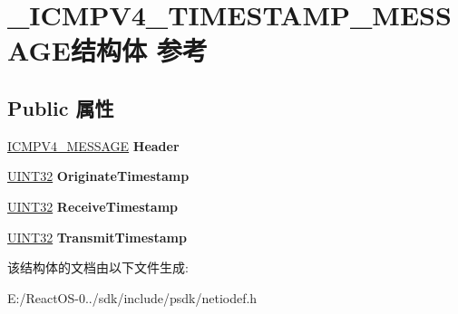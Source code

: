 \hypertarget{struct___i_c_m_p_v4___t_i_m_e_s_t_a_m_p___m_e_s_s_a_g_e}{}\section{\+\_\+\+I\+C\+M\+P\+V4\+\_\+\+T\+I\+M\+E\+S\+T\+A\+M\+P\+\_\+\+M\+E\+S\+S\+A\+G\+E结构体 参考}
\label{struct___i_c_m_p_v4___t_i_m_e_s_t_a_m_p___m_e_s_s_a_g_e}
\subsection*{Public 属性}
\begin{DoxyCompactItemize}
\item 
\mbox{\label{struct___i_c_m_p_v4___t_i_m_e_s_t_a_m_p___m_e_s_s_a_g_e_a83d58e0fb406bd0f44b53d55fc98228b}} 
\hyperlink{struct___i_c_m_p___m_e_s_s_a_g_e}{I\+C\+M\+P\+V4\+\_\+\+M\+E\+S\+S\+A\+GE} {\bfseries Header}
\item 
\mbox{\label{struct___i_c_m_p_v4___t_i_m_e_s_t_a_m_p___m_e_s_s_a_g_e_a6e328b10926545f7daa6ea7c339fe4d4}} 
\hyperlink{_processor_bind_8h_ae1e6edbbc26d6fbc71a90190d0266018}{U\+I\+N\+T32} {\bfseries Originate\+Timestamp}
\item 
\mbox{\label{struct___i_c_m_p_v4___t_i_m_e_s_t_a_m_p___m_e_s_s_a_g_e_ace8ca7049d47fbd452e24bf4d066fbcb}} 
\hyperlink{_processor_bind_8h_ae1e6edbbc26d6fbc71a90190d0266018}{U\+I\+N\+T32} {\bfseries Receive\+Timestamp}
\item 
\mbox{\label{struct___i_c_m_p_v4___t_i_m_e_s_t_a_m_p___m_e_s_s_a_g_e_a77f3b2a8e115de6d27a81b9d6893a9c4}} 
\hyperlink{_processor_bind_8h_ae1e6edbbc26d6fbc71a90190d0266018}{U\+I\+N\+T32} {\bfseries Transmit\+Timestamp}
\end{DoxyCompactItemize}


该结构体的文档由以下文件生成\+:\begin{DoxyCompactItemize}
\item 
E\+:/\+React\+O\+S-\/0../sdk/include/psdk/netiodef.\+h\end{DoxyCompactItemize}

